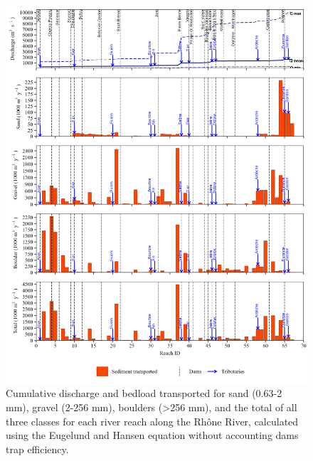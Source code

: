 \documentclass[
]{book}
\begin{document}
\begin{figure}
\includegraphics[width=26.24in]{img/res_cascade/res_E0_eE&H_noDams/plots_transp-silt/transp_res_sum_hy_E0_eE&H_noDams} \caption{Cumulative discharge and bedload transported for sand (0.63-2 mm), gravel (2-256 mm), boulders (>256 mm), and the total of all three classes for each river reach along the Rhône River, calculated using the Eugelund and Hansen equation without accounting dams trap efficiency.}\label{fig:TrE0eE}
\end{figure}
\end{document}
